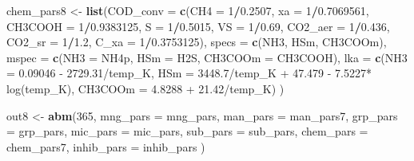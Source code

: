 \documentclass[
]{article}
\newenvironment{Shaded}{\begin{snugshade}}{\end{snugshade}}
\newcommand{\AttributeTok}[1]{\textcolor[rgb]{0.13,0.29,0.53}{#1}}
\newcommand{\DecValTok}[1]{\textcolor[rgb]{0.00,0.00,0.81}{#1}}
\newcommand{\FloatTok}[1]{\textcolor[rgb]{0.00,0.00,0.81}{#1}}
\newcommand{\FunctionTok}[1]{\textcolor[rgb]{0.13,0.29,0.53}{\textbf{#1}}}
\newcommand{\NormalTok}[1]{#1}
\newcommand{\OtherTok}[1]{\textcolor[rgb]{0.56,0.35,0.01}{#1}}
\newcommand{\SpecialCharTok}[1]{\textcolor[rgb]{0.81,0.36,0.00}{\textbf{#1}}}
\newcommand{\StringTok}[1]{\textcolor[rgb]{0.31,0.60,0.02}{#1}}
\begin{document}
\begin{Shaded}
\begin{Highlighting}[]
\NormalTok{chem\_pars8 }\OtherTok{\textless{}{-}} \FunctionTok{list}\NormalTok{(}\AttributeTok{COD\_conv =} \FunctionTok{c}\NormalTok{(}\AttributeTok{CH4 =} \DecValTok{1}\SpecialCharTok{/}\FloatTok{0.2507}\NormalTok{, }\AttributeTok{xa =} \DecValTok{1}\SpecialCharTok{/}\FloatTok{0.7069561}\NormalTok{,}
                               \AttributeTok{CH3COOH =} \DecValTok{1}\SpecialCharTok{/}\FloatTok{0.9383125}\NormalTok{, }\AttributeTok{S =} \DecValTok{1}\SpecialCharTok{/}\FloatTok{0.5015}\NormalTok{, }\AttributeTok{VS =} \DecValTok{1}\SpecialCharTok{/}\FloatTok{0.69}\NormalTok{, }
                               \AttributeTok{CO2\_aer =} \DecValTok{1}\SpecialCharTok{/}\FloatTok{0.436}\NormalTok{, }\AttributeTok{CO2\_sr =} \DecValTok{1}\SpecialCharTok{/}\FloatTok{1.2}\NormalTok{, }
                               \AttributeTok{C\_xa =} \DecValTok{1}\SpecialCharTok{/}\FloatTok{0.3753125}\NormalTok{),}
                   \AttributeTok{specs =} \FunctionTok{c}\NormalTok{(}\StringTok{\textquotesingle{}NH3\textquotesingle{}}\NormalTok{, }\StringTok{\textquotesingle{}HSm\textquotesingle{}}\NormalTok{, }\StringTok{\textquotesingle{}CH3COOm\textquotesingle{}}\NormalTok{),}
                   \AttributeTok{mspec =} \FunctionTok{c}\NormalTok{(}\AttributeTok{NH3 =} \StringTok{\textquotesingle{}NH4p\textquotesingle{}}\NormalTok{, }\AttributeTok{HSm =} \StringTok{\textquotesingle{}H2S\textquotesingle{}}\NormalTok{, }\AttributeTok{CH3COOm =} \StringTok{\textquotesingle{}CH3COOH\textquotesingle{}}\NormalTok{),}
                   \AttributeTok{lka =} \FunctionTok{c}\NormalTok{(}\AttributeTok{NH3 =} \StringTok{\textquotesingle{}{-} 0.09046 {-} 2729.31/temp\_K\textquotesingle{}}\NormalTok{, }
                           \AttributeTok{HSm =} \StringTok{\textquotesingle{}{-} 3448.7/temp\_K + 47.479 {-} 7.5227* log(temp\_K)\textquotesingle{}}\NormalTok{,}
                           \AttributeTok{CH3COOm =} \StringTok{\textquotesingle{}{-}4.8288 + 21.42/temp\_K\textquotesingle{}}\NormalTok{)}
\NormalTok{)}
\end{Highlighting}
\end{Shaded}

\begin{Shaded}
\begin{Highlighting}[]
\NormalTok{out8 }\OtherTok{\textless{}{-}} \FunctionTok{abm}\NormalTok{(}\DecValTok{365}\NormalTok{,}
            \AttributeTok{mng\_pars =}\NormalTok{ mng\_pars,}
            \AttributeTok{man\_pars =}\NormalTok{ man\_pars7,}
            \AttributeTok{grp\_pars =}\NormalTok{ grp\_pars,}
            \AttributeTok{mic\_pars =}\NormalTok{ mic\_pars,}
            \AttributeTok{sub\_pars =}\NormalTok{ sub\_pars,}
            \AttributeTok{chem\_pars =}\NormalTok{ chem\_pars7,}
            \AttributeTok{inhib\_pars =}\NormalTok{ inhib\_pars}
\NormalTok{)}
\end{Highlighting}
\end{Shaded}
\end{document}
